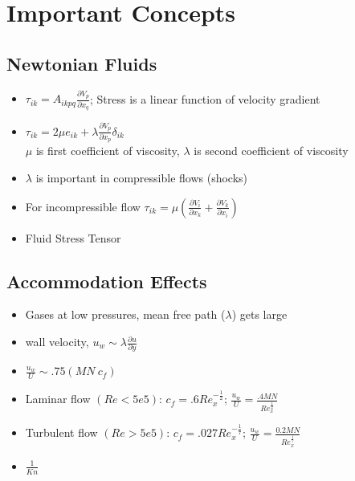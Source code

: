 \documentclass[a4paper]{article}
\begin{document}
\newcommand\barbelow[1]{\stackunder[1.2pt]{$#1$}{\rule{.8ex}{.075ex}}}
\newcommand\partderiv[2]{\frac{\partial #1}{\partial #2}}
\newcommand\partderivtwo[2]{\frac{\partial^2 #1}{\partial^2 #2}}
\newcommand\matderiv[2]{\frac{D #1}{D #2}}
\newcommand\kdel[1]{\delta_{#1}}

\newcommand\hcancel[2][black]{\setbox0=\hbox{$#2$}%
\rlap{\raisebox{.45\ht0}{\textcolor{#1}{\rule{\wd0}{1pt}}}}#2}  



\section{Important Concepts}
    \subsection{Newtonian Fluids}
    \begin{itemize}

        \item $\tau_{ik} = A_{ikpq} \partderiv{V_p}{x_q}$; Stress is a linear function of velocity gradient
        \item $\tau_{ik} = 2 \mu e_{ik} + \lambda \partderiv{V_p}{x_p}\delta_{ik}$ \\ 
        $\mu$ is first coefficient of viscosity, $\lambda$ is second coefficient of viscosity
        \item $\lambda$ is important in compressible flows (shocks)
        \item For incompressible flow $\tau_{ik} = \mu \left( \partderiv{V_i}{x_k} + \partderiv{V_k}{x_i} \right)$
        \item Fluid Stress Tensor
    \end{itemize}

    \subsection{Accommodation Effects}
    \begin{itemize}
        \item Gases at low pressures, mean free path ($\lambda$) gets large
        \item wall velocity, $u_w \sim \lambda \partderiv{u}{y}$
        \item $\frac{u_w}{U} \sim .75 \left(MN\ c_f\right)$
        \item Laminar flow $(Re < 5e5)$: $c_f = .6 Re_x^{-\frac{1}{2}}$; $\frac{u_w}{U} = \frac{.4 MN}{Re_x^{\frac{1}{2}}}$
        \item Turbulent flow $(Re > 5e5)$: $c_f = .027 Re_x^{-\frac{1}{7}}$; $\frac{u_w}{U} = \frac{0.2 MN}{Re_x^{\frac{1}{7}}}$
        \item $\frac{1}{Kn}$
    \end{itemize}
\end{document}
